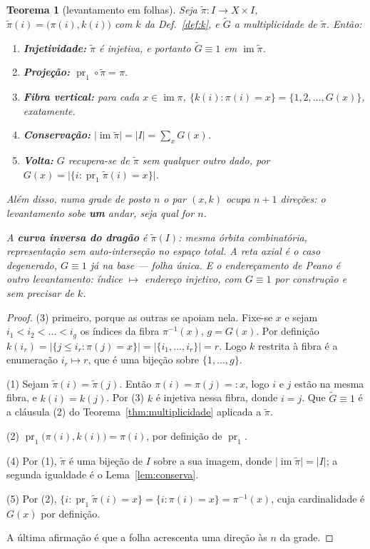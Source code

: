 \documentclass[11pt,a4paper]{article}
\newcommand{\abs}[1]{\lvert #1\rvert}
\newtheorem{teorema}{Teorema}
\begin{document}
\begin{teorema}[levantamento em folhas]\label{thm:levantamento}
Seja $\tilde\pi\colon I\to X\times I$, $\tilde\pi(i)=\bigl(\pi(i),k(i)\bigr)$ com
$k$ da Def.~\ref{def:k}, e $\tilde G$ a multiplicidade de $\tilde\pi$. Então:
\begin{enumerate}\itemsep3pt
\item[(1)] \textbf{Injetividade:} $\tilde\pi$ é injetiva, e portanto
$\tilde G\equiv1$ em $\operatorname{im}\tilde\pi$.
\item[(2)] \textbf{Projeção:} $\operatorname{pr}_1\circ\tilde\pi=\pi$.
\item[(3)] \textbf{Fibra vertical:} para cada $x\in\operatorname{im}\pi$,
$\{k(i):\pi(i)=x\}=\{1,2,\dots,G(x)\}$, exatamente.
\item[(4)] \textbf{Conservação:}
$\lvert\operatorname{im}\tilde\pi\rvert=\abs{I}=\sum_x G(x)$.
\item[(5)] \textbf{Volta:} $G$ recupera-se de $\tilde\pi$ sem qualquer outro
dado, por $G(x)=\bigl\lvert\{i:\operatorname{pr}_1\tilde\pi(i)=x\}\bigr\rvert$.
\end{enumerate}
Além disso, numa grade de posto $n$ o par $(x,k)$ ocupa $n+1$ direções: o
levantamento sobe
\textbf{um} andar, seja qual for $n$.

A \textbf{curva inversa do dragão} é $\tilde\pi(I)$: mesma órbita combinatória,
representação sem auto-interseção no espaço total. A reta axial é o caso
degenerado, $G\equiv1$ já na base --- folha única. E o endereçamento de Peano é
\emph{outro} levantamento: índice $\mapsto$ endereço injetivo, com
$G\equiv1$ por construção e sem precisar de $k$.
\end{teorema}

\begin{proof}
(3) primeiro, porque as outras se apoiam nela. Fixe-se $x$ e sejam
$i_1<i_2<\dots<i_g$ os índices da fibra $\pi^{-1}(x)$, $g=G(x)$. Por
definição $k(i_r)=\lvert\{j\le i_r:\pi(j)=x\}\rvert=\lvert\{i_1,\dots,i_r\}\rvert=r$.
Logo $k$ restrita à fibra é a enumeração $i_r\mapsto r$, que é uma bijeção sobre
$\{1,\dots,g\}$.

(1) Sejam $\tilde\pi(i)=\tilde\pi(j)$. Então $\pi(i)=\pi(j)=:x$, logo $i$ e $j$
estão na mesma fibra, e $k(i)=k(j)$. Por (3) $k$ é injetiva nessa fibra, donde
$i=j$. Que $\tilde G\equiv1$ é a cláusula (2) do
Teorema~\ref{thm:multiplicidade} aplicada a $\tilde\pi$.

(2) $\operatorname{pr}_1\bigl(\pi(i),k(i)\bigr)=\pi(i)$, por definição de
$\operatorname{pr}_1$.

(4) Por (1), $\tilde\pi$ é uma bijeção de $I$ sobre a sua imagem, donde
$\lvert\operatorname{im}\tilde\pi\rvert=\abs{I}$; a segunda igualdade é o
Lema~\ref{lem:conserva}.

(5) Por (2), $\{i:\operatorname{pr}_1\tilde\pi(i)=x\}=\{i:\pi(i)=x\}=\pi^{-1}(x)$,
cuja cardinalidade é $G(x)$ por definição.

A última afirmação é que a folha acrescenta uma direção às $n$ da grade.
\end{proof}
\end{document}
